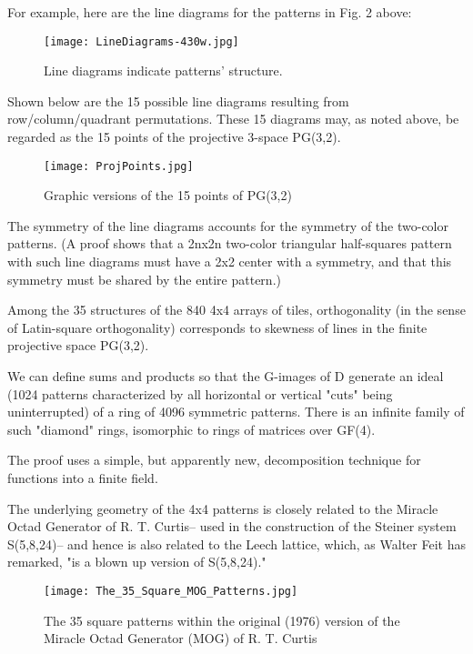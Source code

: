 \documentclass[12pt]{article}
\begin{document}
For example, here are the line diagrams for the patterns in Fig. 2 above:

\begin{figure}
\begin{center}
\texttt{[image: LineDiagrams-430w.jpg]}
\end{center}
\caption{Line diagrams indicate patterns' structure.}
\end{figure}

Shown below are the 15 possible line diagrams resulting from row/column/quadrant permutations. These 15 diagrams may, as noted above, be regarded as the 15 points of the projective 3-space PG(3,2).

\begin{figure}
\begin{center}
\texttt{[image: ProjPoints.jpg]}
\end{center}
\caption{Graphic versions of the 15 points of PG(3,2)}
\end{figure}

The symmetry of the line diagrams accounts for the symmetry of the two-color patterns. (A proof shows that a 2nx2n two-color triangular half-squares pattern with such line diagrams must have a 2x2 center with a symmetry, and that this symmetry must be shared by the entire pattern.)

Among the 35 structures of the 840 4x4 arrays of tiles, orthogonality (in the sense of Latin-square orthogonality) corresponds to skewness of lines in the finite projective space PG(3,2).

We can define sums and products so that the G-images of D generate an ideal (1024 patterns characterized by all horizontal or vertical "cuts" being uninterrupted) of a ring of 4096 symmetric patterns. There is an infinite family of such "diamond" rings, isomorphic to rings of matrices over GF(4).

The proof uses a simple, but apparently new, decomposition technique for functions into a finite field.

The underlying geometry of the 4x4 patterns is closely related to the Miracle Octad Generator of R. T. Curtis-- used in the construction of the Steiner system S(5,8,24)-- and hence is also related to the Leech lattice, which, as Walter Feit has remarked, "is a blown up version of S(5,8,24)."

\begin{figure}
\begin{center}
\texttt{[image: The\_35\_Square\_MOG\_Patterns.jpg]}
\end{center}
\caption{The 35 square patterns within the original (1976) version of the Miracle Octad Generator (MOG) of R. T. Curtis}
\end{figure}
\end{document}
